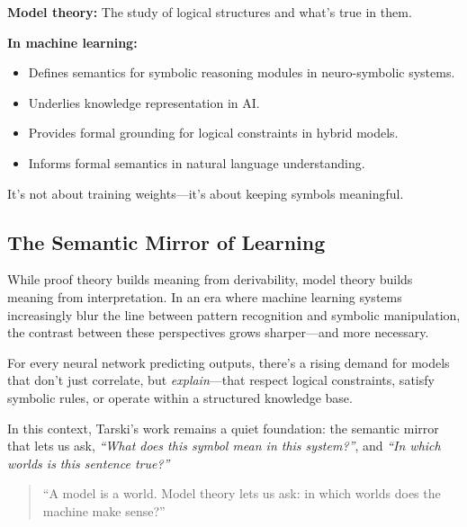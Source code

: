 \begin{tcolorbox}[colback=gray!5!white, colframe=black, title=\textbf{Sidebar: Why Model Theory Matters for ML}, fonttitle=\bfseries, arc=1.5mm, boxrule=0.4pt]
\textbf{Model theory:} The study of logical structures and what’s true in them.

\textbf{In machine learning:}
\begin{itemize}
  \item Defines semantics for symbolic reasoning modules in neuro-symbolic systems.
  \item Underlies knowledge representation in AI.
  \item Provides formal grounding for logical constraints in hybrid models.
  \item Informs formal semantics in natural language understanding.
\end{itemize}

It’s not about training weights—it’s about keeping symbols meaningful.
\end{tcolorbox}

\vspace{1em}

\subsection{The Semantic Mirror of Learning}

While proof theory builds meaning from derivability, model theory builds meaning from interpretation. In an era where machine learning systems increasingly blur the line between pattern recognition and symbolic manipulation, the contrast between these perspectives grows sharper—and more necessary.

For every neural network predicting outputs, there’s a rising demand for models that don’t just correlate, but \emph{explain}—that respect logical constraints, satisfy symbolic rules, or operate within a structured knowledge base.

In this context, Tarski’s work remains a quiet foundation: the semantic mirror that lets us ask, \emph{“What does this symbol mean in this system?”}, and \emph{“In which worlds is this sentence true?”}

\begin{quote}
    “A model is a world. Model theory lets us ask: in which worlds does the machine make sense?”
\end{quote}
